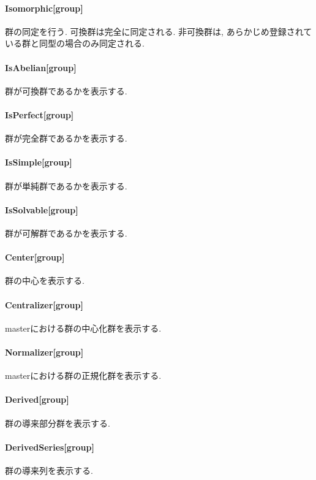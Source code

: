 \documentclass[11pt, a4paper]{jsarticle}
\begin{document}
\paragraph{Isomorphic[group]}
群の同定を行う.
可換群は完全に同定される.
非可換群は, あらかじめ登録されている群と同型の場合のみ同定される.

\paragraph{IsAbelian[group]}
群が可換群であるかを表示する.

\paragraph{IsPerfect[group]}
群が完全群であるかを表示する.

\paragraph{IsSimple[group]}
群が単純群であるかを表示する.

\paragraph{IsSolvable[group]}
群が可解群であるかを表示する.

\paragraph{Center[group]}
群の中心を表示する.

\paragraph{Centralizer[group]}
masterにおける群の中心化群を表示する.

\paragraph{Normalizer[group]}
masterにおける群の正規化群を表示する.

\paragraph{Derived[group]}
群の導来部分群を表示する.

\paragraph{DerivedSeries[group]}
群の導来列を表示する.
\end{document}
